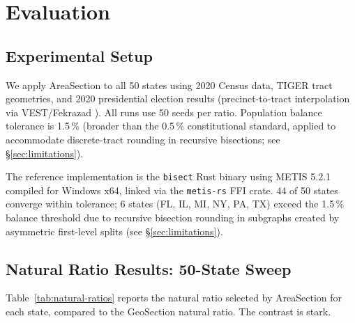 \section{Evaluation}
\label{sec:evaluation}

\subsection{Experimental Setup}

We apply AreaSection to all 50 states using 2020 Census data, TIGER
tract geometries, and 2020 presidential election results (precinct-to-tract
interpolation via VEST/Fekrazad \citep{fekrazad2021}).
All runs use 50 seeds per ratio.
Population balance tolerance is 1.5\,\% (broader than the 0.5\,\%
constitutional standard, applied to accommodate discrete-tract rounding in
recursive bisections; see \S\ref{sec:limitations}).

The reference implementation is the \texttt{bisect} Rust binary using METIS 5.2.1
compiled for Windows x64, linked via the \texttt{metis-rs} FFI crate.
44 of 50 states converge within tolerance; 6 states (FL, IL, MI, NY, PA, TX)
exceed the 1.5\,\% balance threshold due to recursive bisection rounding in
subgraphs created by asymmetric first-level splits (see \S\ref{sec:limitations}).

\subsection{Natural Ratio Results: 50-State Sweep}

Table~\ref{tab:natural-ratios} reports the natural ratio selected by AreaSection
for each state, compared to the GeoSection natural ratio.
The contrast is stark.

